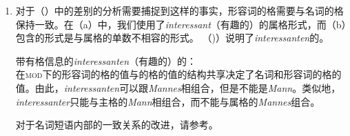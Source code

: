 \begin{enumerate}
{{{{                                   } 
                           } \\
}}
\label{avm-max-lacht}
\item 对于（）中的差别的分析需要捕捉到这样的事实，形容词的格需要与名词的格保持一致。在（a）中，我们使用了\emph{interessant}（有趣的）的属格形式，而（b）包含的形式是与属格的单数不相容的形式。
\eal
{}
\zl
（)）说明了\emph{interessanten}的\catv 。 

\eas
带有格信息的\emph{interessanten}（有趣的）的\catv ：\\
\zs
在\textsc{mod}下的形容词的格的值与\nbar 的格的值的结构共享决定了名词和形容词的格的值。由此，\emph{interessanten}可以跟\emph{Mannes}相组合，但是不能是\emph{Mann}。类似地，\emph{interessanter}只能与主格的\emph{Mann}相组合，而不能与属格的\emph{Mannes}组合。

对于名词短语内部的一致关系的改进，请参考。
\end{enumerate}


